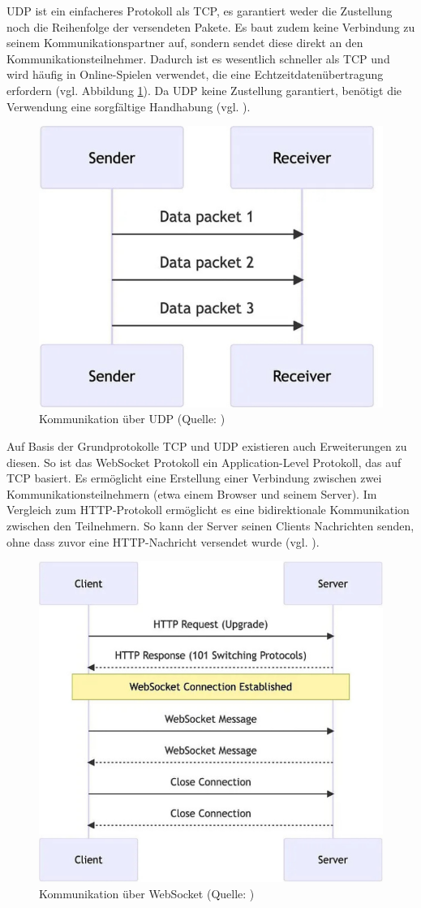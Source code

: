 \ac{UDP} ist ein einfacheres Protokoll als \ac{TCP}, es garantiert weder die Zustellung noch die Reihenfolge der versendeten Pakete. Es baut zudem keine Verbindung zu seinem Kommunikationspartner auf, sondern sendet diese direkt an den Kommunikationsteilnehmer. Dadurch ist es wesentlich schneller als \ac{TCP} und wird häufig in Online-Spielen verwendet, die eine Echtzeitdatenübertragung erfordern (vgl. Abbildung \ref{fig:udp}). Da \ac{UDP} keine Zustellung garantiert, benötigt die Verwendung eine sorgfältige Handhabung (vgl. \cite{mygames_unity_2024}).

\begin{figure}[ht]
\centering
\includegraphics[width=0.5\linewidth]{content/pictures/UDP-Network.png}
\caption{Kommunikation über UDP (Quelle: \cite{mygames_unity_2024})}
\label{fig:udp}
\end{figure}

Auf Basis der Grundprotokolle \ac{TCP} und \ac{UDP} existieren auch Erweiterungen zu diesen. So ist das WebSocket Protokoll ein Application-Level Protokoll, das auf \ac{TCP} basiert. Es ermöglicht eine Erstellung einer Verbindung zwischen zwei Kommunikationsteilnehmern (etwa einem Browser und seinem Server). Im Vergleich zum \ac{HTTP}-Protokoll ermöglicht es eine bidirektionale Kommunikation zwischen den Teilnehmern. So kann der Server seinen Clients Nachrichten senden, ohne dass zuvor eine \ac{HTTP}-Nachricht versendet wurde (vgl. \cite{mygames_unity_2024}).

\begin{figure}[ht]
\centering
\includegraphics[width=0.5\linewidth]{content/pictures/WebSocket-Network.png}
\caption{Kommunikation über WebSocket (Quelle: \cite{mygames_unity_2024})}
\label{fig:ws}
\end{figure}

